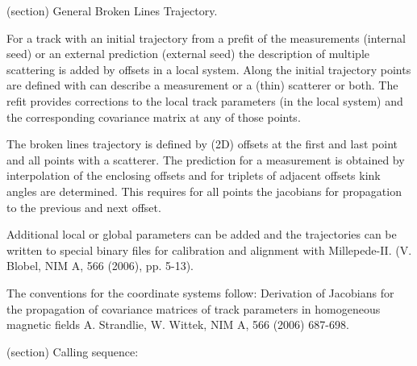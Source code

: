 (section) General Broken Lines Trajectory.

  For a track with an initial trajectory from a prefit of the measurements 
  (internal seed) or an external prediction (external seed) the description
  of multiple scattering is added by offsets in a local system. Along the 
  initial trajectory points are defined with can describe a measurement or 
  a (thin) scatterer or both. The refit provides corrections to the local 
  track parameters (in the local system) and the corresponding covariance 
  matrix at any of those points.

  The broken lines trajectory is defined by (2D) offsets at the first and 
  last point and all points with a scatterer. The prediction for a 
  measurement is obtained by interpolation of the enclosing offsets and for
  triplets of adjacent offsets kink angles are determined. This requires 
  for all points the jacobians for propagation to the previous and next 
  offset.

  Additional local or global parameters can be added and the trajectories 
  can be written to special binary files for calibration and alignment with
  Millepede-II. (V. Blobel, NIM A, 566 (2006), pp. 5-13).

  The conventions for the coordinate systems follow: Derivation of 
  Jacobians for the propagation of covariance matrices of track parameters 
  in homogeneous magnetic fields A. Strandlie, W. Wittek, NIM A, 566 (2006)
  687-698.

(section) Calling sequence:

